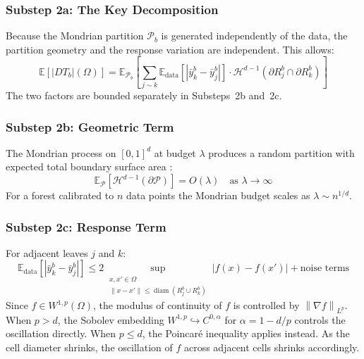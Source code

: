 \documentclass[12pt]{article}
\newcommand{\norm}[1]{\left\| #1 \right\|}
\newcommand{\E}{\mathbb{E}}
\newcommand{\Wonep}{W^{1,p}(\Omega)}
\begin{document}
	\subsubsection*{Substep 2a: The Key Decomposition}
	
	Because the Mondrian partition $\mathcal{P}_b$ is generated independently of
	the data, the partition geometry and the response variation are independent.
	This allows:
	\begin{equation}
		\E\!\left[|DT_b|(\Omega)\right] =
		\mathbb{E}_{\mathcal{P}_b}\!\left[
		\sum_{j \sim k}
		\mathbb{E}_{\mathrm{data}}\!\left[|\bar{y}_k^b - \bar{y}_j^b|\right]
		\cdot \mathcal{H}^{d-1}(\partial R_j^b \cap \partial R_k^b)
		\right]
	\end{equation}
	The two factors are bounded separately in Substeps~2b and~2c.
	
	\subsubsection*{Substep 2b: Geometric Term}
	
	The Mondrian process on $[0,1]^d$ at budget $\lambda$ produces a random
	partition with expected total boundary surface area
	\citep{roy2009mondrian, mourtada2017mondrian}:
	\begin{equation}
		\mathbb{E}_{\mathcal{P}}\!\left[
		\mathcal{H}^{d-1}(\partial \mathcal{P})
		\right] = O(\lambda) \quad \text{as } \lambda \to \infty
	\end{equation}
	For a forest calibrated to $n$ data points the Mondrian budget scales as
	$\lambda \sim n^{1/d}$.
	
	\subsubsection*{Substep 2c: Response Term}
	
	For adjacent leaves $j$ and $k$:
	\begin{equation}
		\mathbb{E}_{\mathrm{data}}\!\left[|\bar{y}_k^b - \bar{y}_j^b|\right]
		\leq 2 \sup_{\substack{x, x' \in \Omega \\ \|x - x'\| \leq
				\operatorname{diam}(R_j^b \cup R_k^b)}} |f(x) - f(x')| +
		\text{noise terms}
	\end{equation}
	Since $f \in \Wonep$, the modulus of continuity of $f$ is controlled by
	$\norm{\nabla f}_{L^p}$. When $p > d$, the Sobolev embedding
	$W^{1,p} \hookrightarrow C^{0,\alpha}$ for $\alpha = 1 - d/p$ controls the
	oscillation directly. When $p \leq d$, the Poincar\'e inequality applies
	instead. As the cell diameter shrinks, the oscillation of $f$ across adjacent
	cells shrinks accordingly.
	
\end{document}
